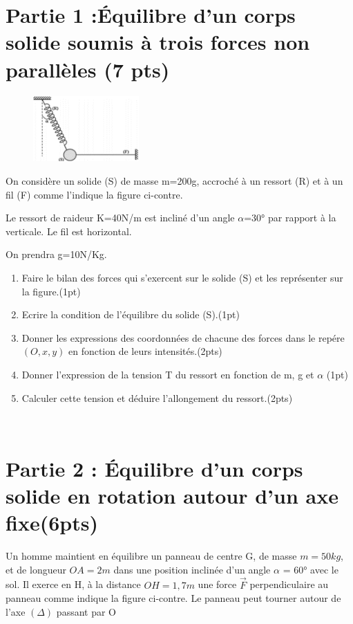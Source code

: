 \documentclass[12pt]{article}
\begin{document}
 \section*{Partie 1 :Équilibre d’un corps solide soumis à trois forces non parallèles (7 pts)}

\begin{figure}
    \vspace{-1.8cm}
    \includegraphics[width=0.36\textwidth]{./img/pendule_simple.png}
\end{figure}

On considère un solide (S) de masse
m=200g, accroché à un ressort (R) et à un fil (F) comme l’indique la figure ci-contre.

Le ressort de raideur K=40N/m est
incliné d’un angle $\alpha$=30° par rapport à la
verticale. Le fil est horizontal.

On prendra g=10N/Kg.

\begin{enumerate}
    \item Faire le bilan des forces qui
s’exercent sur le solide (S) et les
        représenter sur la figure.\dotfill(1pt)

    \item Ecrire la condition de l’équilibre du solide (S).\dotfill(1pt)
    \item Donner les expressions des coordonnées de chacune des forces dans le repére $(O, x, y)$ en fonction de leurs intensités.\dotfill(2pts)
    \item Donner l’expression de la tension T du ressort en fonction de m, g et $\alpha$ \dotfill(1pt)
    \item Calculer cette tension et déduire l’allongement du ressort.\dotfill(2pts)
\end{enumerate}

\vspace{3cm}

\hrulefill\\
\section*{Partie 2 : Équilibre d'un corps solide en rotation autour d'un axe fixe\dotfill(6pts)}
Un homme maintient en équilibre un panneau de centre G, de
masse $m = 50kg$, et de longueur $OA = 2m$ dans une position
inclinée d’un angle $\alpha$ = 60° avec le sol. Il exerce en H, à la
distance $OH = 1,7m$ une force $\vec{F}$ perpendiculaire au panneau
comme indique la figure ci-contre. Le panneau peut tourner
autour de l’axe $(\Delta)$ passant par O
\end{document}
